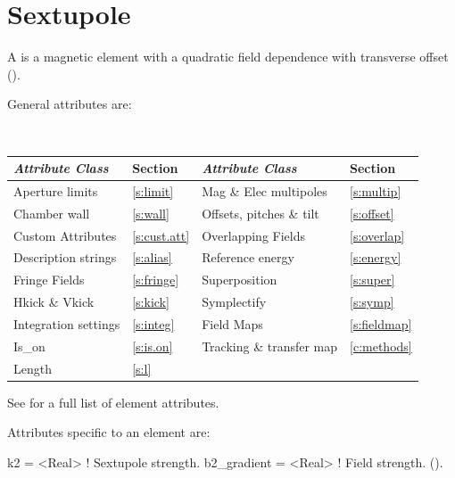 {%
\section{Sextupole}
\label{s:sex}

A  is a magnetic element with a quadratic field
dependence with transverse offset ().

General  attributes are:
\begin{center}
\tt
\begin{tabular}{llll} \toprule
  {\sl Attribute Class}      & Section           & {\sl Attribute Class}      & Section           \\ \midrule
  Aperture limits            & \ref{s:limit}     & Mag \& Elec multipoles     & \ref{s:multip}    \\
  Chamber wall               & \ref{s:wall}      & Offsets, pitches \& tilt   & \ref{s:offset}    \\
  Custom Attributes          & \ref{s:cust.att}  & Overlapping Fields         & \ref{s:overlap}   \\
  Description strings        & \ref{s:alias}     & Reference energy           & \ref{s:energy}    \\ 
  Fringe Fields              & \ref{s:fringe}    & Superposition              & \ref{s:super}     \\
  Hkick \& Vkick             & \ref{s:kick}      & Symplectify                & \ref{s:symp}      \\
  Integration settings       & \ref{s:integ}     & Field Maps                 & \ref{s:fieldmap}  \\
  Is_on                      & \ref{s:is.on}     & Tracking \& transfer map   & \ref{c:methods}   \\ 
  Length                     & \ref{s:l}         &                            &                   \\ 
  \bottomrule
\end{tabular}
\end{center}
\toffset
See  for a full list of element attributes.

Attributes specific to an  element are:
\begin{example}
  k2          = <Real>   ! Sextupole strength.
  b2_gradient = <Real>   ! Field strength. ().
\end{example}

}
